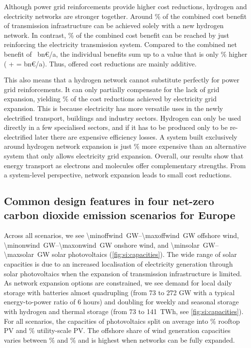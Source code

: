 Although power grid reinforcements provide higher cost reductions, hydrogen and
electricity networks are stronger together. Around \hyoftotalbenefit\% of the
combined cost benefit of transmission infrastructure can be achieved solely with
a new hydrogen network. In contrast, \acoftotalbenefit\% of the combined cost
benefit can be reached by just reinforcing the electricity transmission system.
Compared to the combined net benefit of \gridbenefitabs~bn\euro/a, the
individual benefits sum up to a value that is only \additivebenefitrel\% higher
(\maxacbenefitabs{} + \maxhybenefitabs{} = \additivebenefitabs{} bn\euro/a).
Thus, offered cost reductions are mainly additive.

This also means that a hydrogen network cannot substitute perfectly for power
grid reinforcements. It can only partially compensate for the lack of grid
expansion, yielding \benefithyofac\% of the cost reductions achieved by
electricity grid expansion. This is because electricity has more versatile uses
in the newly electrified transport, buildings and industry sectors. Hydrogen can
only be used directly in a few specialised sectors, and if it has to be produced
only to be re-electrified later there are expensive efficiency losses.  A system
built exclusively around hydrogen network expansion is just \acvshycost\% more
expensive than an alternative system that only allows electricity grid
expansion. Overall, our results show that energy transport as electrons and
molecules offer complementary strengths. From a system-level perspective,
network expansion leads to small cost reductions.

\subsection*{Common design features in four net-zero carbon dioxide emission scenarios for Europe}
\label{sec:es}

Across all scenarios, we see \SIrange{\minoffwind}{\maxoffwind}{\giga\watt}
offshore wind, \SIrange{\minonwind}{\maxonwind}{\giga\watt} onshore wind, and
\SIrange{\minsolar}{\maxsolar}{\giga\watt} solar photovoltaics
(\cref{fig:si:capacities}). The wide range of solar capacities is due to an
increased localisation of electricity generation through solar photovoltaics
when the expansion of transmission infrastructure is limited. As network
expansion options are constrained, we see demand for local daily storage with
batteries almost quadrupling (from 73 to 272 GW with a typical energy-to-power
ratio of 6 hours) and doubling for weekly and seasonal storage with hydrogen and
thermal storage (from 73 to 141~TWh, see \cref{fig:si:capacities}). For all
scenarios, the capacities of photovoltaics split on average into
\meanrooftopshare\% rooftop PV and \meanutilityshare\% utility-scale PV. The
offshore share of wind generation capacities varies between \minoffshoreshare\%
and \maxoffshoreshare\% and is highest when networks can be fully expanded.

